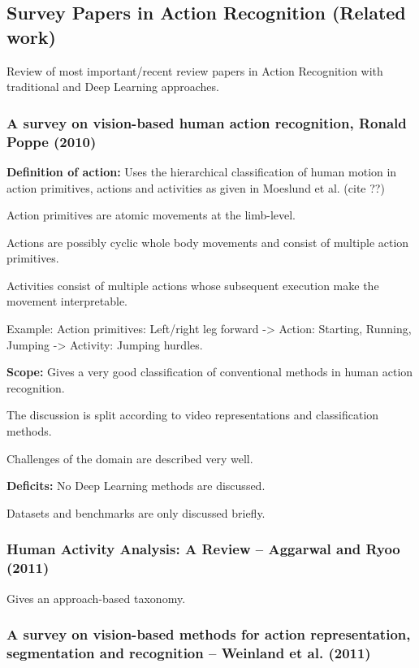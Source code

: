 \subsection{Survey Papers in Action Recognition (Related work)}

Review of most important/recent review papers in Action Recognition with traditional and Deep Learning approaches.

\subsubsection{A survey on vision-based human action recognition, Ronald Poppe (2010)}

\textbf{Definition of action:} Uses the hierarchical classification of human motion in action primitives, actions and activities as given in Moeslund et al. (cite ??)

Action primitives are atomic movements at the limb-level.

Actions are possibly cyclic whole body movements and consist of multiple action primitives.

Activities consist of multiple actions whose subsequent execution make the movement interpretable.

Example: Action primitives: Left/right leg forward -> Action: Starting, Running, Jumping -> Activity: Jumping hurdles.

\textbf{Scope:} Gives a very good classification of conventional methods in human action recognition.

The discussion is split according to video representations and classification methods.

Challenges of the domain are described very well.

\textbf{Deficits:} No Deep Learning methods are discussed. 

Datasets and benchmarks are only discussed briefly.

\subsubsection{Human Activity Analysis: A Review -- Aggarwal and Ryoo (2011)}

Gives an approach-based taxonomy.

\subsubsection{A survey on vision-based methods for action representation, segmentation and recognition -- Weinland et al. (2011)}

